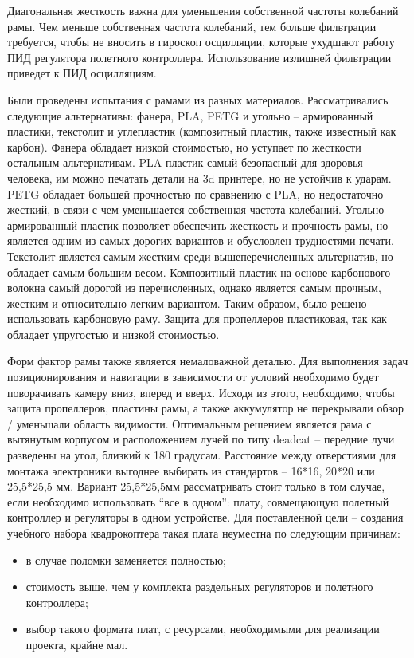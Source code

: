 Диагональная жесткость важна для уменьшения собственной частоты колебаний рамы. Чем меньше собственная частота колебаний, тем больше фильтрации требуется, чтобы не вносить в гироскоп осцилляции, которые ухудшают работу ПИД регулятора полетного контроллера. Использование излишней фильтрации приведет к ПИД осцилляциям.

Были проведены испытания с рамами из разных материалов. Рассматривались следующие альтернативы: фанера, PLA, PETG и угольно -- армированный пластики, текстолит и углепластик (композитный пластик, также известный как карбон). Фанера обладает низкой стоимостью, но уступает по жесткости остальным альтернативам. PLA пластик самый безопасный для здоровья человека, им можно печатать детали на 3d принтере, но не устойчив к ударам. PETG обладает большей прочностью по сравнению с PLA, но недостаточно жесткий, в связи с чем уменьшается собственная частота колебаний. Угольно-армированный пластик позволяет обеспечить жесткость и прочность рамы, но является одним из самых дорогих вариантов и обусловлен трудностями печати.
Текстолит является самым жестким среди вышеперечисленных альтернатив, но обладает самым большим весом. Композитный пластик на основе карбонового волокна самый дорогой из перечисленных, однако является самым прочным, жестким и относительно легким вариантом. Таким образом, было решено использовать карбоновую раму.
Защита для пропеллеров пластиковая, так как обладает упругостью и низкой стоимостью.

Форм фактор рамы также является немаловажной деталью. Для выполнения задач позиционирования и навигации в зависимости от условий необходимо будет поворачивать камеру вниз, вперед и вверх. Исходя из этого, необходимо, чтобы защита пропеллеров, пластины рамы, а также аккумулятор не перекрывали обзор / уменьшали область видимости. Оптимальным решением является рама с вытянутым корпусом и расположением лучей по типу deadcat -- передние лучи разведены на угол, близкий к 180 градусам. Расстояние между отверстиями для монтажа электроники выгоднее выбирать из стандартов -- 16*16, 20*20 или 25,5*25,5 мм. Вариант 25,5*25,5мм рассматривать стоит только в том случае, если необходимо использовать “все в одном”: плату, совмещающую полетный контроллер и регуляторы в одном устройстве. Для поставленной цели -- создания учебного набора квадрокоптера такая плата неуместна по следующим причинам:
\begin{itemize}
	\item в случае поломки заменяется полностью;
	\item стоимость выше, чем у комплекта раздельных регуляторов и полетного контроллера;
	\item выбор такого формата плат, с ресурсами, необходимыми для реализации проекта, крайне мал.
\end{itemize}

